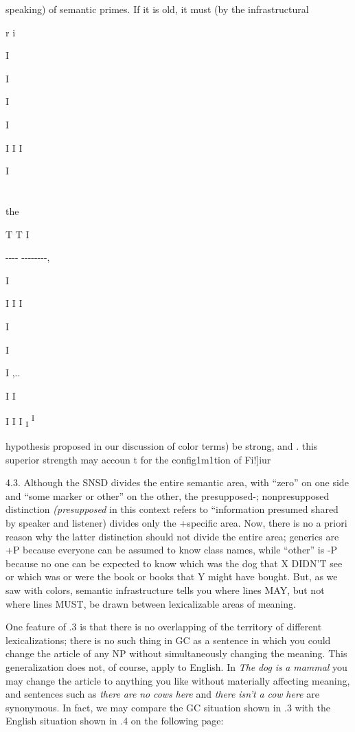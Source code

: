 speaking) of semantic primes. If it is old, it must (by the infrastructural

r i

I

I

I

I

I I I

I

\section{}
the

T T I

{}-{}-{}-{}- {}-{}-{}-{}-{}-{}-{}-{}-,

I 

I I I

I

I

I ,..

I I

I I I \textsubscript{I }\textsuperscript{I} 

hypothesis proposed in our discussion of color terms) be strong, and . this superior strength may accoun t for the config1m1tion of Fi!]iur

4.3. Although the SNSD divides the entire semantic area, with ``zero'' on one side and ``some marker or other'' on the other, the presupposed-; nonpresupposed distinction \textit{(presupposed} in this context refers to ``information presumed shared by speaker and listener{\textquotedbl}) divides only the +specific area. Now, there is no a priori reason why the latter distinction should not divide the entire area; generics are +P because everyone can be assumed to know class names, while ``other'' is {}-P because no one can be expected to know which was the dog that X DIDN'T see or which was or were the book or books that Y might have bought. But, as we saw with colors, semantic infrastructure tells you where lines MAY, but not where lines MUST, be drawn between lexicalizable areas of meaning.

One feature of .3 is that there is no overlapping of the territory of different lexicalizations; there is no such thing in GC as a sentence in which you could change the article of any NP without simultaneously changing the meaning. This generalization does not, of course, apply to English. In \textit{The} \textit{dog} \textit{is} \textit{a} \textit{mammal} you may change the article to anything you like without materially affecting meaning, and sentences such as \textit{there} \textit{are} \textit{no} \textit{cows} \textit{here} and \textit{there} \textit{isn't a} \textit{cow} \textit{here} are synonymous. In fact, we may compare the GC situation shown in .3 with the English situation shown in .4 on the following page:

